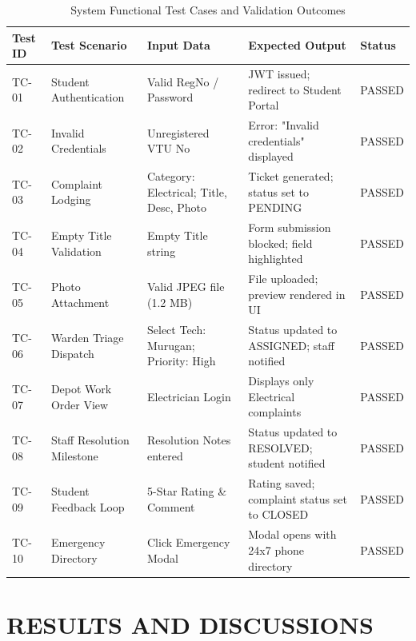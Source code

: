 \documentclass[10pt]{report}
\begin{document}
\begin{table}[H]
\centering
\small
\renewcommand{\arraystretch}{1.25}
\begin{tabular}{|p{1.2cm}|p{3.2cm}|p{3.5cm}|p{3.5cm}|p{1.4cm}|}
\hline
\textbf{Test ID} & \textbf{Test Scenario} & \textbf{Input Data} & \textbf{Expected Output} & \textbf{Status} \\
\hline
TC-01 & Student Authentication & Valid RegNo / Password & JWT issued; redirect to Student Portal & PASSED \\
\hline
TC-02 & Invalid Credentials & Unregistered VTU No & Error: "Invalid credentials" displayed & PASSED \\
\hline
TC-03 & Complaint Lodging & Category: Electrical; Title, Desc, Photo & Ticket generated; status set to PENDING & PASSED \\
\hline
TC-04 & Empty Title Validation & Empty Title string & Form submission blocked; field highlighted & PASSED \\
\hline
TC-05 & Photo Attachment & Valid JPEG file (1.2 MB) & File uploaded; preview rendered in UI & PASSED \\
\hline
TC-06 & Warden Triage Dispatch & Select Tech: Murugan; Priority: High & Status updated to ASSIGNED; staff notified & PASSED \\
\hline
TC-07 & Depot Work Order View & Electrician Login & Displays only Electrical complaints & PASSED \\
\hline
TC-08 & Staff Resolution Milestone & Resolution Notes entered & Status updated to RESOLVED; student notified & PASSED \\
\hline
TC-09 & Student Feedback Loop & 5-Star Rating \& Comment & Rating saved; complaint status set to CLOSED & PASSED \\
\hline
TC-10 & Emergency Directory & Click Emergency Modal & Modal opens with 24x7 phone directory & PASSED \\
\hline
\end{tabular}
\caption{System Functional Test Cases and Validation Outcomes}
\end{table}

\chapter{RESULTS AND DISCUSSIONS}
\linespread{1.5}
\end{document}
